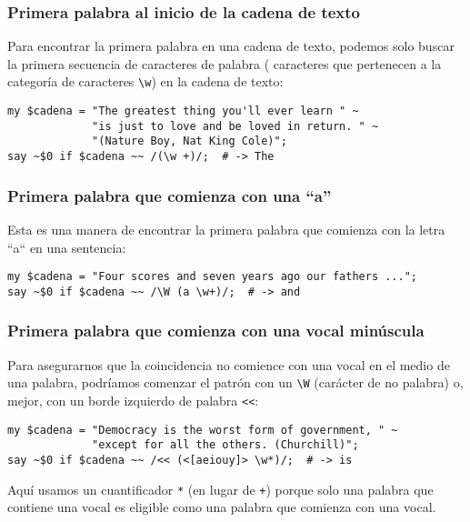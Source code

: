 \subsubsection{Primera palabra al inicio de la cadena de texto}

Para encontrar la primera palabra en una cadena de texto, podemos
solo buscar la primera secuencia de caracteres de palabra (
caracteres que pertenecen a la categoría de caracteres \verb|\w|)
en la cadena de texto:

\begin{verbatim}
my $cadena = "The greatest thing you'll ever learn " ~
             "is just to love and be loved in return. " ~
             "(Nature Boy, Nat King Cole)";
say ~$0 if $cadena ~~ /(\w +)/;  # -> The
\end{verbatim}


\subsubsection{Primera palabra que comienza con una ``a''}

Esta es una manera de encontrar la primera palabra que comienza
con la letra ``a`` en una sentencia:

\begin{verbatim}
my $cadena = "Four scores and seven years ago our fathers ...";
say ~$0 if $cadena ~~ /\W (a \w+)/;  # -> and
\end{verbatim}

\subsubsection{Primera palabra que comienza con una vocal minúscula}

Para asegurarnos que la coincidencia no comience con una vocal 
en el medio de una palabra, podríamos comenzar el patrón con un
\verb|\W| (carácter de no palabra) o, mejor, con un borde izquierdo
de palabra \verb|<<|:

\begin{verbatim}
my $cadena = "Democracy is the worst form of government, " ~
             "except for all the others. (Churchill)";
say ~$0 if $cadena ~~ /<< (<[aeiouy]> \w*)/;  # -> is
\end{verbatim}

Aquí usamos un cuantificador \verb|*| (en lugar de \verb|+|) 
porque solo una palabra que contiene una vocal es eligible
como una palabra que comienza con una vocal.

